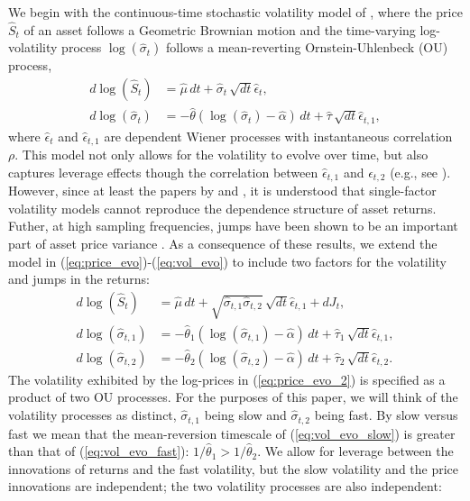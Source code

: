 We begin with the continuous-time stochastic volatility model of \cite{hull1987pricing}, where the price $\hat{S}_t$ of an asset follows a Geometric Brownian motion and the time-varying log-volatility process $\log(\hat{\sigma}_t)$ follows a mean-reverting Ornstein-Uhlenbeck (OU) process,
\begin{align}
  d\log(\hat{S}_t) &= \hat{\mu}\, dt + \hat{\sigma}_t\, \sqrt{dt} \hat{\epsilon}_{t}  ,  \label{eq:price_evo} \\
  d\log( \hat{ \sigma }_t) &= -\hat{\theta} ( \log(\hat{\sigma}_t ) - \hat{\alpha} )\, dt + \hat{\tau}\, \sqrt{dt} \hat{\epsilon}_{t,1}  ,  \label{eq:vol_evo}
\end{align}
where $\hat{\epsilon}_{t}$ and $\hat{\epsilon}_{t,1}$ are dependent Wiener processes with instantaneous correlation $\rho$.  This model not only allows for the volatility to evolve over time, but also captures leverage effects though the correlation between $\hat{\epsilon}_{t,1}$ and $\hat{\epsilon}_{t,2}$ (e.g., see \cite{black1976pricing}). However, since at least the papers by \cite{barndorff2001multifactor} and \cite{chernov2003alternative}, it is understood that single-factor volatility models cannot reproduce the dependence structure of asset returns. Futher, at high sampling frequencies, jumps have been shown to be an important part of asset price variance \cite{huang2005relative}. As a consequence of these results, we extend the model in (\ref{eq:price_evo})-(\ref{eq:vol_evo}) to include two factors for the volatility and jumps in the returns:
\begin{align}
  d\log(\hat{S}_t) &= \hat{\mu}\, dt + \sqrt{\hat{\sigma}_{t,1} \hat{\sigma}_{t,2}}\, \sqrt{dt} \hat{\epsilon}_{t,1} + dJ_t  ,   \label{eq:price_evo_2}\\
  d\log( \hat{ \sigma }_{t,1}) &= -\hat{\theta}_1 ( \log(\hat{\sigma}_{t,1} ) - \hat{\alpha} )\, dt + \hat{\tau}_1\, \sqrt{dt} \hat{\epsilon}_{t,1}  , \label{eq:vol_evo_slow} \\
  d\log( \hat{ \sigma }_{t,2}) &= -\hat{\theta}_2 ( \log(\hat{\sigma}_{t,2} ) - \hat{\alpha} )\, dt + \hat{\tau}_2\, \sqrt{dt} \hat{\epsilon}_{t,2}  . \label{eq:vol_evo_fast}
\end{align}
The volatility exhibited by the log-prices in (\ref{eq:price_evo_2}) is specified as a product of two OU processes. For the purposes of this paper, we will think of the volatility processes as distinct, $\hat{\sigma}_{t,1}$ being slow and $\hat{\sigma}_{t,2}$ being fast. By slow versus fast we mean that the mean-reversion timescale of (\ref{eq:vol_evo_slow}) is greater than that of (\ref{eq:vol_evo_fast}): $1/\hat{\theta}_1 > 1/\hat{\theta}_2$. We allow for leverage between the innovations of returns and the fast volatility, but the slow volatility and the price innovations are independent; the two volatility processes are also independent:
